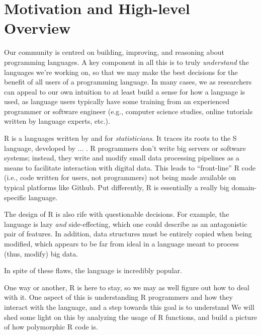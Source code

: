 \documentclass[acmsmall,10pt,review,anonymous]{acmart}\settopmatter{printfolios=true,printccs=false,printacmref=false}
\begin{document}



%
%
%
%
%
%
\section{Motivation and High-level Overview}

Our community is centred on building, improving, and reasoning about programming languages.
A key component in all this is to truly \textit{understand} the languages we're working on, so that we may make the best decisions for the benefit of all users of a programming language.
In many cases, we as researchers can appeal to our own intuition to at least build a sense for how a language is used, as language users typically have some training from an experienced programmer or software engineer (e.g., computer science studies, online tutorials written by language experts, etc.).

R is a languages written by and for \textit{statisticians}.
It traces its roots to the S language, developed by ... .
R programmers don't write big servers or software systems; instead, they write and modify small data processing pipelines as a means to facilitate interaction with digital data.
This leads to ``front-line'' R code (i.e., code written for users, not programmers) not being made available on typical platforms like Github.
Put differently, R is essentially a really big domain-specific language.

The design of R is also rife with questionable decisions.
For example, the language is lazy \textit{and} side-effecting, which one could describe as an antagonistic pair of features.
In addition, data structures must be entirely copied when being modified, which appears to be far from ideal in a language meant to process (thus, modify) big data.

In spite of these flaws, the language is incredibly popular.

One way or another, R is here to stay, so we may as well figure out how to deal with it.
One aspect of this is understanding R programmers and how they interact with the language, and a step towards this goal is to understand 
We will shed some light on this by analyzing the usage of R functions, and build a picture of how polymorphic R code is.
\end{document}
